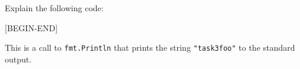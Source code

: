 Explain the following code:


[BEGIN-END]


\begin{solution}
    This is a call to \lstinline{fmt.Println}
    that prints the string \lstinline{"task3foo"} to the standard output.
\end{solution}
